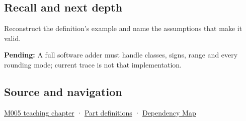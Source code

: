 \subsection{Recall and next depth}\label{appendix-a1b1b4580dfd-recall-and-next-depth}

Reconstruct the definition's example and name the assumptions that make it valid.

\textbf{Pending:} A full software adder must handle classes, signs, range and every rounding mode; current trace is not that implementation.

\subsection{Source and navigation}\label{appendix-a1b1b4580dfd-source-and-navigation}

\hyperref[01-foundations-i-ch001-when-arithmetic-meets-uncertainty]{M005 teaching chapter} · \hyperref[appendix-fd090d982a15-m005---parts-77-88]{Part definitions} · \hyperref[appendix-4ad47bdd269a]{Dependency Map}
